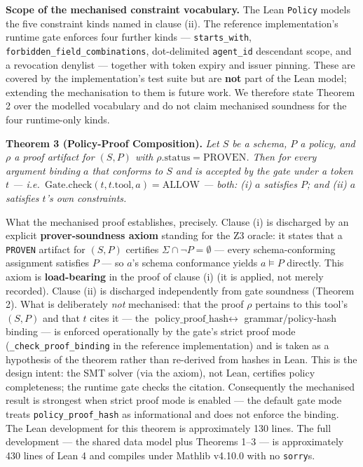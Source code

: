 \textbf{Scope of the mechanised constraint vocabulary.} The Lean
\texttt{Policy} models the five constraint kinds named in clause (ii).
The reference implementation's runtime gate enforces four further kinds
--- \texttt{starts\_with}, \texttt{forbidden\_field\_combinations},
dot-delimited \texttt{agent\_id} descendant scope, and a revocation
denylist --- together with token expiry and issuer pinning. These are
covered by the implementation's test suite but are \textbf{not} part of
the Lean model; extending the mechanisation to them is future work. We
therefore state Theorem 2 over the modelled vocabulary and do not claim
mechanised soundness for the four runtime-only kinds.

\textbf{Theorem 3 (Policy-Proof Composition).} \emph{Let \(S\) be a
schema, \(P\) a policy, and \(\rho\) a proof artifact for \((S, P)\)
with \(\rho.\text{status} = \text{PROVEN}\). Then for every argument
binding \(a\) that conforms to \(S\) and is accepted by the gate under a
token \(t\) ---
i.e.~\(\text{Gate.check}(t, t.\text{tool}, a) = \text{ALLOW}\) --- both:
(i) \(a\) satisfies \(P\); and (ii) \(a\) satisfies \(t\)'s own
constraints.}

What the mechanised proof establishes, precisely. Clause (i) is
discharged by an explicit \textbf{prover-soundness axiom} standing for
the Z3 oracle: it states that a \texttt{PROVEN} artifact for \((S, P)\)
certifies \(\Sigma \cap \neg P = \emptyset\) --- every schema-conforming
assignment satisfies \(P\) --- so \(a\)'s schema conformance yields
\(a \models P\) directly. This axiom is \textbf{load-bearing} in the
proof of clause (i) (it is applied, not merely recorded). Clause (ii) is
discharged independently from gate soundness (Theorem 2). What is
deliberately \emph{not} mechanised: that the proof \(\rho\) pertains to
this tool's \((S, P)\) and that \(t\) cites it --- the
\(\text{policy\_proof\_hash} \leftrightarrow\) grammar/policy-hash
binding --- is enforced operationally by the gate's strict proof mode
(\texttt{\_check\_proof\_binding} in the reference implementation) and
is taken as a hypothesis of the theorem rather than re-derived from
hashes in Lean. This is the design intent: the SMT solver (via the
axiom), not Lean, certifies policy completeness; the runtime gate checks
the citation. Consequently the mechanised result is strongest when
strict proof mode is enabled --- the default gate mode treats
\texttt{policy\_proof\_hash} as informational and does not enforce the
binding. The Lean development for this theorem is approximately 130
lines. The full development --- the shared data model plus Theorems 1--3
--- is approximately 430 lines of Lean 4 and compiles under Mathlib
v4.10.0 with no \texttt{sorry}s.

